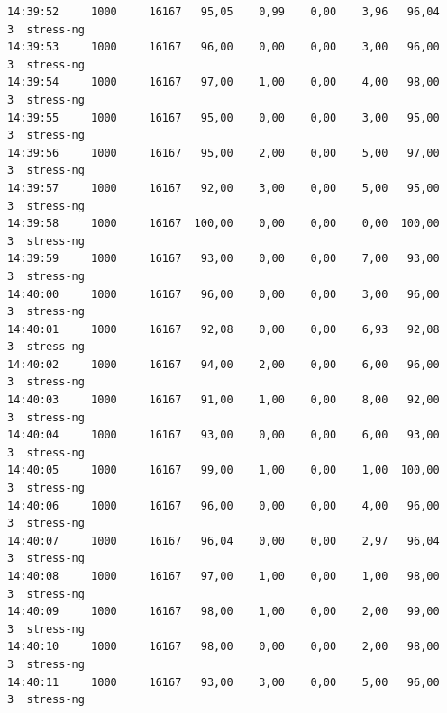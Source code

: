\begin{verbatim}
14:39:52     1000     16167   95,05    0,99    0,00    3,96   96,04     3  stress-ng
14:39:53     1000     16167   96,00    0,00    0,00    3,00   96,00     3  stress-ng
14:39:54     1000     16167   97,00    1,00    0,00    4,00   98,00     3  stress-ng
14:39:55     1000     16167   95,00    0,00    0,00    3,00   95,00     3  stress-ng
14:39:56     1000     16167   95,00    2,00    0,00    5,00   97,00     3  stress-ng
14:39:57     1000     16167   92,00    3,00    0,00    5,00   95,00     3  stress-ng
14:39:58     1000     16167  100,00    0,00    0,00    0,00  100,00     3  stress-ng
14:39:59     1000     16167   93,00    0,00    0,00    7,00   93,00     3  stress-ng
14:40:00     1000     16167   96,00    0,00    0,00    3,00   96,00     3  stress-ng
14:40:01     1000     16167   92,08    0,00    0,00    6,93   92,08     3  stress-ng
14:40:02     1000     16167   94,00    2,00    0,00    6,00   96,00     3  stress-ng
14:40:03     1000     16167   91,00    1,00    0,00    8,00   92,00     3  stress-ng
14:40:04     1000     16167   93,00    0,00    0,00    6,00   93,00     3  stress-ng
14:40:05     1000     16167   99,00    1,00    0,00    1,00  100,00     3  stress-ng
14:40:06     1000     16167   96,00    0,00    0,00    4,00   96,00     3  stress-ng
14:40:07     1000     16167   96,04    0,00    0,00    2,97   96,04     3  stress-ng
14:40:08     1000     16167   97,00    1,00    0,00    1,00   98,00     3  stress-ng
14:40:09     1000     16167   98,00    1,00    0,00    2,00   99,00     3  stress-ng
14:40:10     1000     16167   98,00    0,00    0,00    2,00   98,00     3  stress-ng
14:40:11     1000     16167   93,00    3,00    0,00    5,00   96,00     3  stress-ng


\end{verbatim}
